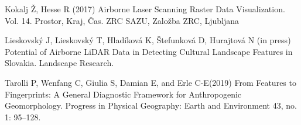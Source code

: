 {Kokalj Ž, Hesse R (2017) Airborne Laser Scanning Raster Data Visualization. Vol. 14. Prostor, Kraj, Čas. ZRC SAZU, Založba ZRC, Ljubljana
	
Lieskovský J, Lieskovský T, Hladíková K, Štefunková D, Hurajtová N (in press) Potential of Airborne LiDAR Data in Detecting Cultural Landscape Features in Slovakia. Landscape Research.
	
Tarolli P, Wenfang C, Giulia S, Damian E, and Erle C-E(2019) From Features to Fingerprints: A General Diagnostic Framework for Anthropogenic Geomorphology. Progress in Physical Geography: Earth and Environment 43, no. 1: 95–128.}%


